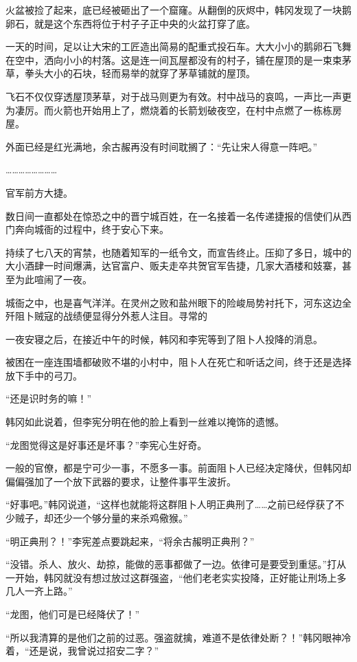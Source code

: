 火盆被捡了起来，底已经被砸出了一个窟窿。从翻倒的灰烬中，韩冈发现了一块鹅卵石，就是这个东西将位于村子子正中央的火盆打穿了底。

一天的时间，足以让大宋的工匠造出简易的配重式投石车。大大小小的鹅卵石飞舞在空中，洒向小小的村落。这是连一间瓦屋都没有的村子，铺在屋顶的是一束束茅草，拳头大小的石块，轻而易举的就穿了茅草铺就的屋顶。

飞石不仅仅穿透屋顶茅草，对于战马则更为有效。村中战马的哀鸣，一声比一声更为凄厉。而火箭也开始用上了，燃烧着的长箭划破夜空，在村中点燃了一栋栋房屋。

外面已经是红光满地，余古赧再没有时间耽搁了：“先让宋人得意一阵吧。”

……………………

官军前方大捷。

数日间一直都处在惊恐之中的晋宁城百姓，在一名接着一名传递捷报的信使们从西门奔向城衙的过程中，终于安心下来。

持续了七八天的宵禁，也随着知军的一纸令文，而宣告终止。压抑了多日，城中的大小酒肆一时间爆满，达官富户、贩夫走卒共贺官军告捷，几家大酒楼和妓寨，甚至为此喧闹了一夜。

城衙之中，也是喜气洋洋。在灵州之败和盐州眼下的险峻局势衬托下，河东这边全歼阻卜贼寇的战绩便显得分外惹人注目。寻常的

一夜安寝之后，在接近中午的时候，韩冈和李宪等到了阻卜人投降的消息。

被困在一座连围墙都破败不堪的小村中，阻卜人在死亡和听话之间，终于还是选择放下手中的弓刀。

“还是识时务的嘛！”

韩冈如此说着，但李宪分明在他的脸上看到一丝难以掩饰的遗憾。

“龙图觉得这是好事还是坏事？”李宪心生好奇。

一般的官僚，都是宁可少一事，不愿多一事。前面阻卜人已经决定降伏，但韩冈却偏偏强加了一个放下武器的要求，让整件事平生波折。

“好事吧。”韩冈说道，“这样也就能将这群阻卜人明正典刑了……之前已经俘获了不少贼子，却还少一个够分量的来杀鸡儆猴。”

“明正典刑？！”李宪差点要跳起来，“将余古赧明正典刑？”

“没错。杀人、放火、劫掠，能做的恶事都做了一边。依律可是要受到重惩。”打从一开始，韩冈就没有想过放过这群强盗，“他们老老实实投降，正好能让刑场上多几人一齐上路。”

“龙图，他们可是已经降伏了！”

“所以我清算的是他们之前的过恶。强盗就擒，难道不是依律处断？！”韩冈眼神冷着，“还是说，我曾说过招安二字？”

